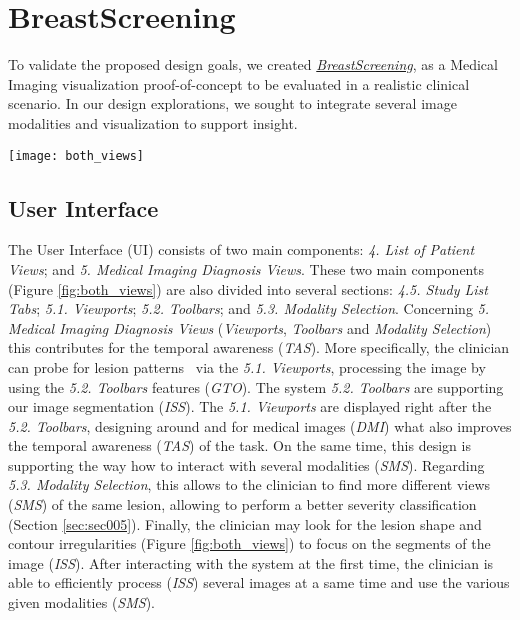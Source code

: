 \section{BreastScreening}
\label{sec:sec004}
To validate the proposed design goals, we created \hyperlink{https://breastscreening.github.io/}{{\it BreastScreening}}, as a Medical Imaging visualization proof-of-concept to be evaluated in a realistic clinical scenario.
In our design explorations, we sought to integrate several image modalities and visualization to support insight.

\begin{figure*}[htbp]
\centering
\texttt{[image: both\_views]}
\caption{\scriptsize \textit{Single-Modality} (left) and \textit{Multi-Modality} (right) Views. The UI components are as follows: \textit{4. List of Patient Views}; and \textit{4.5. Study List Tabs}; as well as \textit{5. Medical Imaging Diagnosis Views}; \textit{5.1. Viewports}; \textit{5.2. Toolbars}; and \textit{5.3. Modality Selection}.}
\label{fig:both_views}
\end{figure*}

\subsection{User Interface}

The User Interface (UI) consists of two main components:
\textit{4. List of Patient Views}; and
\textit{5. Medical Imaging Diagnosis Views}.
These two main components (Figure \ref{fig:both_views}) are also divided into several sections:
\textit{4.5. Study List Tabs};
\textit{5.1. Viewports};
\textit{5.2. Toolbars}; and
\textit{5.3. Modality Selection}.
Concerning \textit{5. Medical Imaging Diagnosis Views} ({\em Viewports}, {\em Toolbars} and {\em Modality Selection}) this contributes for the temporal awareness (\textit{TAS}).
More specifically, the clinician can probe for lesion patterns~\cite{10.1007/978-3-030-00928-1_62} via the \textit{5.1. Viewports}, processing the image by using the \textit{5.2. Toolbars} features (\textit{GTO}).
The system \textit{5.2. Toolbars} are supporting our image segmentation (\textit{ISS}).
The \textit{5.1. Viewports} are displayed right after the \textit{5.2. Toolbars}, designing around and for medical images (\textit{DMI}) what also improves the temporal awareness (\textit{TAS}) of the task.
On the same time, this design is supporting the way how to interact with several modalities (\textit{SMS}).
Regarding \textit{5.3. Modality Selection}, this allows to the clinician to find more different views (\textit{SMS}) of the same lesion, allowing to perform a better severity classification (Section \ref{sec:sec005}).
Finally, the clinician may look for the lesion shape and contour irregularities (Figure \ref{fig:both_views}) to focus on the segments of the image (\textit{ISS}).
After interacting with the system at the first time, the clinician is able to efficiently process (\textit{ISS}) several images at a same time and use the various given modalities (\textit{SMS}).

